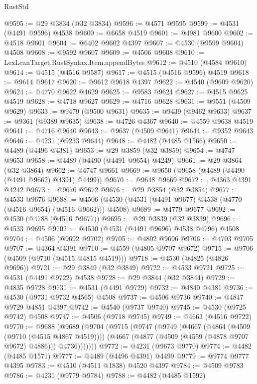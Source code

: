 \begin{lexlean}{RustStd}
\begin{coremodule}
{\begin{coremodule}
{{{{{{{{{{{{{{{{{{{{{{{{{{{{{{{{{{{{{{{{{{{{{{{{{{{{{{{@9595 := @29 @3834 (@32 @3834)
@9596 := @4571 @9595
@9599 := @4531 (@4491 @9596) @4538
@9600 := @6658 @4519
@9601 := @4981 @9600
@9602 := @4518 @9601
@9604 := @6402 @9602 @4397
@9607 := @4530 (@9599 @9604) @4508
@9608 := @9592 @9607
@9609 := @4506 @9608
@9610 := LexLeanTarget.RustSyntax.Item.appendBytes
@9612 := @4510 (@4584 @9610)
@9614 := @4515 (@4516 @9587)
@9617 := @4515 (@4516 @9596) @4519
@9618 := @9614 @9617
@9620 := @9612 @9618 @4397
@9622 := @4540 (@9609 @9620)
@9624 := @4770 @9622 @4629
@9625 := @9583 @9624
@9627 := @4515 @9625 @4519
@9628 := @4718 @9627
@9629 := @4716 @9628
@9631 := @9551 (@4509 @9629)
@9633 := @9479 (@9500 @9631)
@9635 := @9439 (@9462 @9633)
@9637 := @9361 (@9389 @9635)
@9638 := @4726 @4367
@9640 := @4559 @9638 @4519
@9641 := @4716 @9640
@9643 := @9637 (@4509 @9641)
@9644 := @9352 @9643
@9646 := @4231 (@9233 @9644)
@9648 := @4482 (@4485 @1566)
@9650 := @4489 (@4496 @4381)
@9653 := @29 @3859 (@32 @3859)
@9654 := @4747 @9653
@9658 := @4489 (@4490 (@4491 @9654) @4249)
@9661 := @29 @3864 (@32 @3864)
@9662 := @4747 @9661
@9669 := @9650 (@9658 (@4489 (@4490 (@4491 @9662) @4391) @4499))
@9670 := @9648 @9669
@9672 := @4363 @4391 @4242
@9673 := @9670 @9672
@9676 := @29 @3854 (@32 @3854)
@9677 := @4533 @9676
@9688 := @4506 (@4530 (@4531 (@4491 @9677) @4538 (@4770 (@4516 @9654) (@4516 @9662))) @4508)
@9689 := @4779 @9677
@9692 := @4530 (@4788 (@4516 @9677))
@9695 := @29 @3839 (@32 @3839)
@9696 := @4533 @9695
@9702 := @4530 (@4531 (@4491 @9696) @4538 @4796) @4508
@9704 := @4506 (@9692 @9702)
@9705 := @4802 @9696
@9706 := @4703 @9705
@9707 := @4364 @4391
@9710 := @4559 (@4805 @9707 @9672)
@9715 := @9706 (@4509 (@9710 (@4515 @4815 @4519)))
@9718 := @4530 (@4825 (@4826 @9696))
@9721 := @29 @3849 (@32 @3849)
@9722 := @4533 @9721
@9725 := @4531 (@4491 @9722) @4538
@9728 := @29 @3844 (@32 @3844)
@9729 := @4835 @9728
@9731 := @4531 (@4491 @9729)
@9732 := @4840 @4381
@9736 := @4530 (@9731 @9732 @4565) @4508
@9737 := @4506 @9736
@9740 := @4847 @9729 @4851 @4397
@9742 := @4540 (@9737 @9740)
@9745 := @4530 (@9725 @9742) @4508
@9747 := @4506 (@9718 @9745)
@9749 := @4663 (@4516 @9722)
@9770 := @9688
    (@9689
      (@9704
        (@9715
          (@9747
            (@9749
              (@4667
                (@4864 (@4509 (@9710 (@4515 @4867 @4519))))
                (@4667 (@4877 (@4509 (@4559 (@4878 @9707 @9672) @4886))) @4736)))))))
@9772 := @4231 (@9673 @9770)
@9774 := @4482 (@4485 @1571)
@9777 := @4489 (@4496 @4391) @4499
@9779 := @9774 @9777 @4395
@9783 := @4510 (@4511 @1838) @4520 @4397
@9784 := @4509 @9783
@9786 := @4231 (@9779 @9784)
@9788 := @4482 (@4485 @1592)
}}}}}}}}}}}}}}}}}}}}}}}}}}}}}}}}}}}}}}}}}}}}}}}}}}}}}}}
\end{coremodule}}
\end{coremodule}
\end{lexlean}
